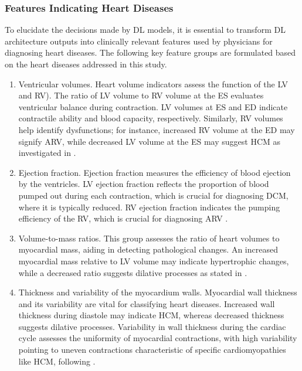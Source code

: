 \documentclass[fleqn,10pt]{wlscirep}
\begin{document}
\subsubsection*{Features Indicating Heart Diseases}

To elucidate the decisions made by DL models, it is essential to transform DL architecture outputs into clinically relevant features used by physicians for diagnosing heart diseases. The following key feature groups are formulated based on the heart diseases addressed in this study.

\begin{enumerate}[label=Group \arabic*:, leftmargin=6em]
    \item Ventricular volumes. Heart volume indicators assess the function of the LV and RV). The ratio of LV volume to RV volume at the ES evaluates ventricular balance during contraction. LV volumes at ES and ED indicate contractile ability and blood capacity, respectively. Similarly, RV volumes help identify dysfunctions; for instance, increased RV volume at the ED may signify ARV, while decreased LV volume at the ES may suggest HCM as investigated in \cite{Izquierdo:2021,Afshin:2014}.
    \item Ejection fraction. Ejection fraction measures the efficiency of blood ejection by the ventricles. LV ejection fraction reflects the proportion of blood pumped out during each contraction, which is crucial for diagnosing DCM, where it is typically reduced. RV ejection fraction indicates the pumping efficiency of the RV, which is crucial for diagnosing ARV \cite{Afshin:2014}.
    \item Volume-to-mass ratios. This group assesses the ratio of heart volumes to myocardial mass, aiding in detecting pathological changes. An increased myocardial mass relative to LV volume may indicate hypertrophic changes, while a decreased ratio suggests dilative processes as stated in \cite{Zheng:2019,Afshin:2014}.
    \item Thickness and variability of the myocardium walls. Myocardial wall thickness and its variability are vital for classifying heart diseases. Increased wall thickness during diastole may indicate HCM, whereas decreased thickness suggests dilative processes. Variability in wall thickness during the cardiac cycle assesses the uniformity of myocardial contractions, with high variability pointing to uneven contractions characteristic of specific cardiomyopathies like HCM, following \cite{Izquierdo:2021}.
\end{enumerate}
\end{document}
